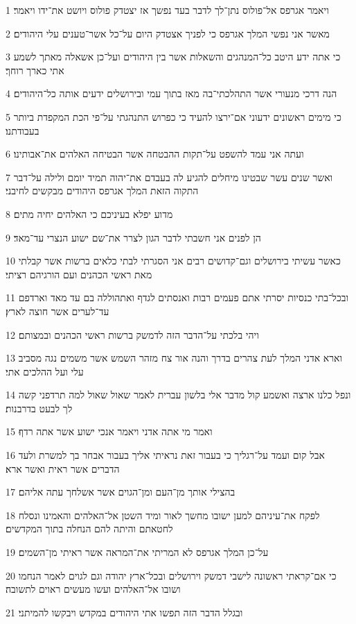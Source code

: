 \par 1 ויאמר אגרפס אל־פולוס נתן־לך לדבר בעד נפשך אז יצטדק פולוס ויושט את־ידו ויאמר׃
\par 2 מאשר אני נפשי המלך אגרפס כי לפניך אצטדק היום על־כל אשר־טענים עלי היהודים׃
\par 3 כי אתה ידע היטב כל־המנהגים והשאלות אשר בין היהודים ועל־כן אשאלה מאתך לשמע אתי כארך רוחך׃
\par 4 הנה דרכי מנעורי אשר התהלכתי־בה מאז בתוך עמי ובירושלים ידעים אותה כל־היהודים׃
\par 5 כי מימים ראשונים ידעוני אם־ירצו להעיד כי כפרוש התנהגתי על־פי הכת המקפדת ביותר בעבודתנו׃
\par 6 ועתה אני עמד להשפט על־תקות ההבטחה אשר הבטיחה האלהים את־אבותינו׃
\par 7 ואשר שנים עשר שבטינו מיחלים להגיע לה בעבדם את־יהוה תמיד יומם ולילה על־דבר התקוה הזאת המלך אגרפס היהודים מבקשים לחיבני׃
\par 8 מדוע יפלא בעיניכם כי האלהים יחיה מתים׃
\par 9 הן לפנים אני חשבתי לדבר הגון לצרר את־שם ישוע הנצרי עד־מאד׃
\par 10 כאשר עשיתי בירושלים וגם־קדושים רבים אני הסגרתי לבתי כלאים ברשות אשר קבלתי מאת ראשי הכהנים ועם הורגיהם רציתי׃
\par 11 ובכל־בתי כנסיות יסרתי אתם פעמים רבות ואנסתים לגדף ואתהוללה בם עד מאד וארדפם עד־לערים אשר חוצה לארץ׃
\par 12 ויהי בלכתי על־הדבר הזה לדמשק ברשות ראשי הכהנים ובמצותם׃
\par 13 וארא אדני המלך לעת צהרים בדרך והנה אור צח מזהר השמש אשר משמים נגה מסביב עלי ועל ההלכים אתי׃
\par 14 ונפל כלנו ארצה ואשמע קול מדבר אלי בלשון עברית לאמר שאול שאול למה תרדפני קשה לך לבעט בדרבנות׃
\par 15 ואמר מי אתה אדני ויאמר אנכי ישוע אשר אתה רדף׃
\par 16 אבל קום ועמד על־רגליך כי בעבור זאת נראיתי אליך בעבור אבחר בך למשרת ולעד הדברים אשר ראית ואשר ארא׃
\par 17 בהצילי אותך מן־העם ומן־הגוים אשר אשלחך עתה אליהם׃
\par 18 לפקח את־עיניהם למען ישובו מחשך לאור ומיד השטן אל־האלהים והאמינו ונסלח לחטאתם והיתה להם הנחלה בתוך המקדשים׃
\par 19 על־כן המלך אגרפס לא המריתי את־המראה אשר ראיתי מן־השמים׃
\par 20 כי אם־קראתי ראשונה לישבי דמשק וירושלים ובכל־ארץ יהודה וגם לגוים לאמר הנחמו ושובו אל־האלהים ועשו מעשים ראוים לתשובה׃
\par 21 ובגלל הדבר הזה תפשו אתי היהודים במקדש ויבקשו להמיתני׃
